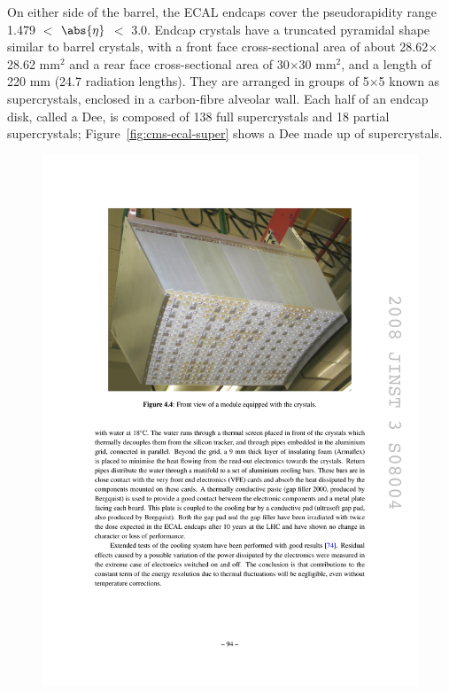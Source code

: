On either side of the barrel, the ECAL endcaps cover the pseudorapidity range 1.479 $<$ $\abs{\eta}$ $<$ 3.0. Endcap crystals have a truncated pyramidal shape similar to barrel crystals, with a front face cross-sectional area of about 28.62$\times$28.62 mm$^2$ and a rear face cross-sectional area of 30$\times$30 mm$^2$, and a length of 220 mm (24.7 radiation lengths). They are arranged in groups of 5$\times$5 known as supercrystals, enclosed in a carbon-fibre alveolar wall. Each half of an endcap disk, called a Dee, is composed of 138 full supercrystals and 18 partial supercrystals; Figure~\ref{fig:cms-ecal-super} shows a Dee made up of supercrystals.

\begin{figure}[hbtp]
  \begin{center}
    \includegraphics[width=\cmsFigWidth]{figures/cms-ecal-supermodule}

\end{center}
\end{figure}
